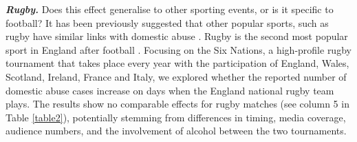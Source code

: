 \documentclass[12pt, a4paper]{article}
\begin{document}

\textbf{\textit{Rugby.}} Does this effect generalise to other sporting events, or is it specific to football?
It has been previously suggested that other popular sports, such as rugby have similar links with domestic abuse \cite{Brooks-Hay2018}. Rugby is the second most popular sport in England after football \cite{Ipsos2003}. Focusing on the Six Nations, a high-profile rugby tournament that takes place every year with the participation of England, Wales, Scotland, Ireland, France and Italy, we explored whether the reported number of domestic abuse cases increase on days when the England national rugby team plays. The results show no comparable effects for rugby matches (see column 5 in Table \ref{table2}), potentially stemming from differences in timing, media coverage, audience numbers, and the involvement of alcohol between the two tournaments. 
\end{document}
